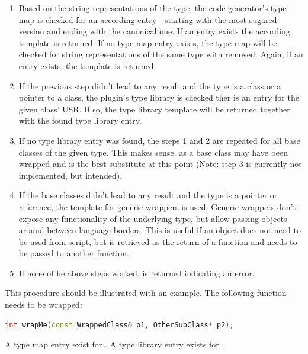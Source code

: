 \begin{enumerate}
\item Based on the string representations of the type, the code generator's type map is checked for an according entry - starting with the most sugared version and ending with the canonical one. If an entry exists the according template is returned. If no type map entry exists, the type map will be checked for string representations of the same type with  removed. Again, if an entry exists, the template is returned.
\item If the previous step didn't lead to any result and the type is a class or a pointer to a class, the plugin's type library is checked ther is an entry for the given class' USR. If so, the type library template will be returned together with the found type library entry.
\item If no type library entry was found, the steps 1 and 2 are repeated for all base classes of the given type. This makes sense, as a base class may have been wrapped and is the best substitute at this point (Note: step 3 is currently not implemented, but intended).
\item If the base classes didn't lead to any result and the type is a pointer or reference, the template for generic wrappers is used. Generic wrappers don't expose any functionality of the underlying type, but allow passing objects around between language borders. This is useful if an object does not need to be used from script, but is retrieved as the return of a  function and needs to be passed to another  function.
\item If none of he above steps worked,  is returned indicating an error.
\end{enumerate}

This procedure should be illustrated with an example. The following function needs to be wrapped:

\SingleSpacing
\begin{lstlisting}[language=C++, caption=Example function illustrating type resolution]
int wrapMe(const WrappedClass& p1, OtherSubClass* p2);
\end{lstlisting}
\OnehalfSpacing

A type map entry exist for . A type library entry exists for .

